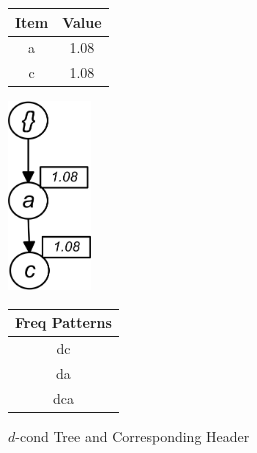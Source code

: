 %
\begin{figure}
\begin{minipage}{0.20\textwidth}
  \centering
	\begin{center}
	\begin{tabular}{ |c|c| } 
 	\hline
 		Item&Value\\ \hline\hline
 		a &  1.08  	\\ \hline
 		c &  1.08   	\\ \hline
 		
\end{tabular}
\end{center}  
\end{minipage}
  \hfill
\hfill
\begin{minipage}{0.12\textwidth}
  \centering
  \hfill
  \includegraphics[width=.8\textwidth, height=5cm]{images/D_COND.jpg}
  \hfill
\end{minipage}
\hfill
\begin{minipage}{0.15\textwidth}
  \centering
  
	\begin{center}
	\begin{tabular}{ |c| } 
 	\hline
 		Freq Patterns \\ \hline\hline
 		dc  	\\ \hline
 		da   	\\ \hline
 		dca   	\\ \hline
 		
\end{tabular}
\end{center}  
\end{minipage}
\caption{$d$-cond Tree and Corresponding Header}
\label{figure:d_cond}
\end{figure}
